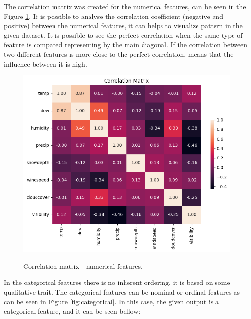 \documentclass{article}
\begin{document}
\begin{enumerate}
    
     


The correlation matrix was created for the numerical features, can be seen in the Figure \ref{fig:4}. It is possible to analyse the correlation coefficient (negative and positive) between the numerical features, it can helps to visualize pattern in the given dataset. It is possible to see the perfect correlation when the same type of feature is compared representing by the main diagonal. If the correlation between two different features is more close to the perfect correlation, means that the influence between it is high.

\begin{figure}[H]
		\centering
		\caption{Correlation matrix - numerical features.}
		\includegraphics[width=0.7\linewidth]{Code/Plots/correlation_matriz.png}
	\label{fig:4}
	\end{figure}


   


In the categorical features there is no inherent ordering. it is based on some qualitative trait. The categorical features can be nominal or ordinal features as can be seen in Figure \ref{fig:categorical}. In this case, the given output is a categorical feature, and it can be seen bellow:


\end{enumerate}
\end{document}
